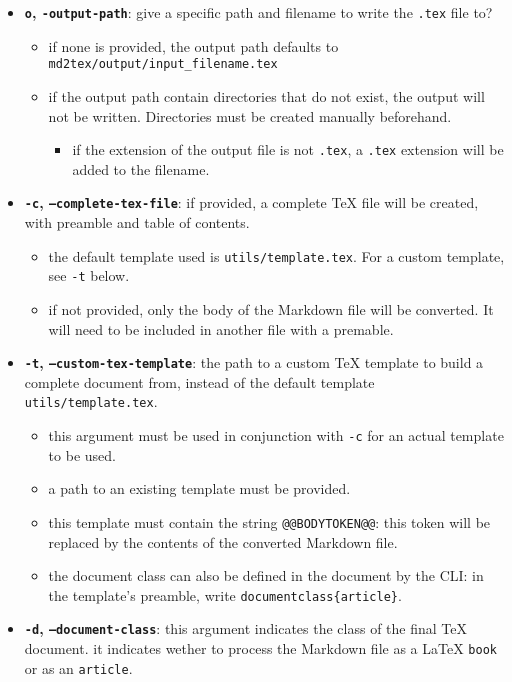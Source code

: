\documentclass[a4paper, 12pt, twoside]{article}
\begin{document}
\begin{itemize}
\item \textbf{\texttt{o}, \texttt{-output-path}}: give a specific path and filename to write the \texttt{.tex} file to?
\begin{itemize} 
 \item if none is provided, the output path defaults to \texttt{md2tex/output/input\_filename.tex}
\item if the output path contain directories that do not exist, the output will not be 	 written. Directories must be created manually beforehand.
\begin{itemize} 
 \item if the extension of the output file is not \texttt{.tex}, a \texttt{.tex} extension will be added to the filename.
\end{itemize}
\end{itemize}
\item \textbf{\texttt{-c}, \texttt{--complete-tex-file}}: if provided, a complete TeX file will be created, with preamble and table of contents. 
\begin{itemize} 
 \item the default template used is \texttt{utils/template.tex}. For a custom template, see \texttt{-t} below.
\item if not provided, only the body of the Markdown file will be converted. It will need to be included 	 in another file with a premable.
\end{itemize}
\item \textbf{\texttt{-t}, \texttt{--custom-tex-template}}: the path to a custom TeX template to build a complete document from, instead of the default template \texttt{utils/template.tex}.
\begin{itemize} 
 \item this argument must be used in conjunction with \texttt{-c} for an actual template to be used.
\item a path to an existing template must be provided.
\item this template must contain the string \texttt{@@BODYTOKEN@@}: this token will be replaced by the contents of the 	 converted Markdown file.
\item the document class can also be defined in the document by the CLI: 	 in the template's preamble, write \texttt{documentclass\{article\}}.
\end{itemize}
\item \textbf{\texttt{-d}, \texttt{--document-class}}: this argument indicates the class of the final TeX document. it indicates wether to process the Markdown file as a LaTeX \texttt{book} or as an \texttt{article}.

\end{itemize}
\end{document}
